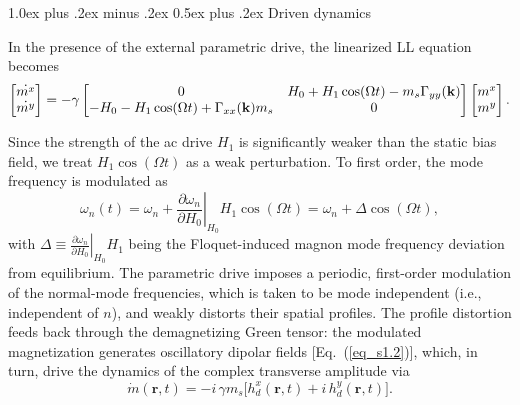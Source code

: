 \documentclass[
twocolumn,

superscriptaddress,









 amsmath,amssymb,
 aps,


prl,




]{revtex4-2}
\makeatletter
\providecommand{\subsubsection}{}
\renewcommand{\subsubsection}{
  \@startsection{subsubsection}{3}{0pt}
    {1.0ex plus .2ex minus .2ex}
    {0.5ex plus .2ex}
    {\normalfont\normalsize\bfseries\filcenter}
}
\makeatother
\begin{document}
\subsubsection{Driven dynamics}

In the presence of the external parametric drive, the linearized LL equation becomes
\begin{equation}
\begin{bmatrix}
\dot{m^x} \\
\dot{m^y}
\end{bmatrix}
= -\gamma
\begin{bmatrix}
0 & H_0 + H_1 \cos(\Omega t) - m_s \Gamma_{yy}(\bold{k}) \\
- H_0 - H_1 \cos(\Omega t)+ \Gamma_{xx}(\bold{k}) m_s  & 0
\end{bmatrix}
\begin{bmatrix}
m^x \\
m^y
\end{bmatrix}.\label{eq_s11}
\end{equation}

Since the strength of the ac drive \(H_1\) is significantly weaker than the static bias field, we treat \(H_1\cos(\Omega t)\) as a weak perturbation. To first order, the mode frequency is modulated as
\begin{equation}
\omega_n(t)=\omega_n+\left.\frac{\partial\omega_n}{\partial H_0}\right|_{H_0} H_1\cos(\Omega t)
=\omega_n+\Delta\cos(\Omega t),
\label{eq_s12}
\end{equation}
with \(\Delta\equiv \left.\frac{\partial\omega_n}{\partial H_0}\right|_{H_0} H_1\) being the Floquet-induced magnon mode frequency deviation from equilibrium. The parametric drive imposes a periodic, first-order modulation of the normal-mode frequencies, which is taken to be mode independent (i.e., independent of $n$),  and weakly distorts their spatial profiles.
 The profile distortion feeds back through the demagnetizing Green tensor: the modulated magnetization generates oscillatory dipolar fields [Eq.~(\ref{eq_s1.2})], which, in turn, drive the dynamics of the complex transverse amplitude via
\begin{equation}
\dot m(\mathbf r,t)=-i\,\gamma m_s\big[h_d^x(\mathbf r,t)+i\,h_d^y(\mathbf r,t)\big].
\label{eq_s14}
\end{equation}
\end{document}
